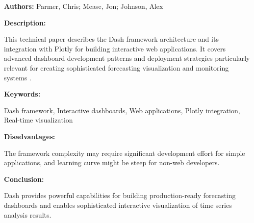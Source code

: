 
{ 
	
	\textbf{Authors:} Parmer, Chris; Mease, Jon; Johnson, Alex
	
	\textbf{Description:}
	
	This technical paper describes the Dash framework architecture and its integration with Plotly for building interactive web applications. It covers advanced dashboard development patterns and deployment strategies particularly relevant for creating sophisticated forecasting visualization and monitoring systems \autocite{DashFramework:2023}.
	
	\textbf{Keywords:}
	
	Dash framework, Interactive dashboards, Web applications, Plotly integration, Real-time visualization
	
	\textbf{Disadvantages:}
	
	The framework complexity may require significant development effort for simple applications, and learning curve might be steep for non-web developers.
	
	\textbf{Conclusion:}
	
	Dash provides powerful capabilities for building production-ready forecasting dashboards and enables sophisticated interactive visualization of time series analysis results.
	
}


